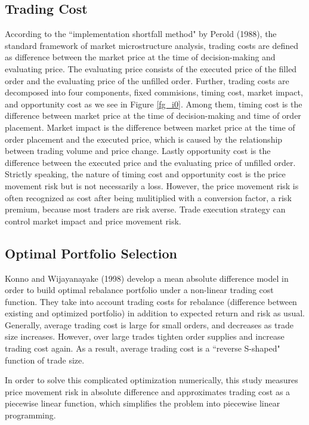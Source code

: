 \subsection{Trading Cost}\label{subsec_r31}
According to the ``implementation shortfall method" by Perold (1988), the standard framework of market microstructure analysis, trading costs are defined as difference between the market price at the time of decision-making and evaluating price. The evaluating price consists of the executed price of the filled order and the evaluating price of the unfilled order.  Further, trading costs are decomposed into four components, fixed commisions, timing cost, market impact, and opportunity cost as we see in Figure \ref{fg_i0}.  Among them, timing cost is the difference between market price at the time of decision-making and time of order placement. Market impact is the difference between market price at the time of order placement and the executed price, which is caused by the relationship between trading volume and price change. Lastly opportunity cost is the difference between the executed price and the evaluating price of unfilled order.  Strictly speaking, the nature of timing cost and opportunity cost is the price movement risk but is not necessarily a loss.  However, the price movement risk is often recognized as cost after being mulitiplied with a conversion factor, a risk premium, because most traders are risk averse.  Trade execution strategy can control market impact and price movement risk.

\subsection{Optimal Portfolio Selection}\label{subsec_r32}
Konno and Wijayanayake (1998) develop a mean absolute difference model in order to build optimal rebalance portfolio under a non-linear trading cost function.  They take into account trading costs for rebalance (difference between existing and optimized portfolio) in addition to expected return and risk as usual. Generally, average trading cost is large for small orders, and decreases as trade size increases.  However, over large trades tighten order supplies and increase trading cost again.  As a result, average trading cost is a ``reverse S-shaped" function of trade size.

In order to solve this complicated optimization numerically, this study measures price movement risk in absolute difference and approximates trading cost as a piecewise linear function, which simplifies the problem into piecewise linear programming.

